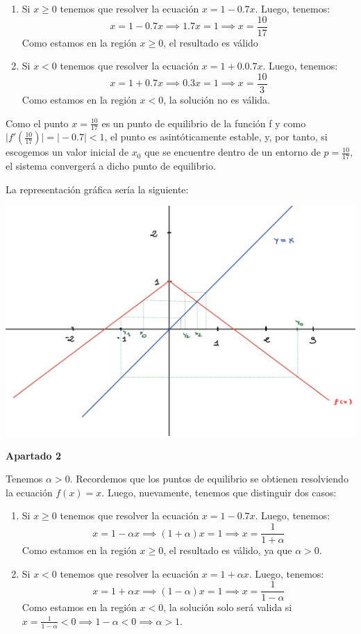 \documentclass[a4paper, 12pt]{article}
\theoremstyle{plain}
\theoremstyle{definition}
\theoremstyle{remark}
\begin{document}
	\begin{enumerate}
		\item Si $x\geq 0$ tenemos que resolver la ecuación $x=1-0.7x$. Luego, tenemos:
		\[x=1-0.7x \implies 1.7x=1 \implies x=\frac{10}{17}\]
		Como estamos en la región $x\geq 0$, el resultado es válido
		\item Si $x<0$ tenemos que resolver la ecuación $x=1+0.0.7x$. Luego, tenemos:
		\[x=1+0.7x \implies 0.3x=1 \implies x=\frac{10}{3}\]
		Como estamos en la región $x<0$, la solución no es válida.
	\end{enumerate}

	Como el punto $x=\frac{10}{17}$ es un punto de equilibrio de la función f y como $\mid f'(\frac{10}{17}) \mid = \mid -0.7 \mid < 1$, el punto es asintóticamente estable, y, por tanto, si escogemos un valor inicial de $x_0$ que se encuentre dentro de un entorno de $p=\frac{10}{17}$, el sistema convergerá a dicho punto de equilibrio.
	
	La representación gráfica sería la siguiente:
	
	\includegraphics[scale=0.25]{graf}
	
	\textbf{Apartado 2}
	
	Tenemos $\alpha >0$. Recordemos que los puntos de equilibrio se obtienen resolviendo la ecuación $f(x)=x$. Luego, nuevamente, tenemos que distinguir dos casos:
	
	\begin{enumerate}
		\item Si $x\geq 0$ tenemos que resolver la ecuación $x=1-0.7x$. Luego, tenemos:
		\[x=1-\alpha x \implies (1+\alpha)x=1 \implies x=\frac{1}{1+\alpha}\]
		Como estamos en la región $x\geq 0$, el resultado es válido, ya que $\alpha >0$.
		\item Si $x<0$ tenemos que resolver la ecuación $x=1+\alpha x$. Luego, tenemos:
		\[x=1+\alpha x \implies (1-\alpha)x=1 \implies x=\frac{1}{1-\alpha}\]
		Como estamos en la región $x<0$, la solución solo será valida si $x=\frac{1}{1-\alpha}<0 \implies 1-\alpha <0 \implies \alpha > 1$.
	\end{enumerate}
\end{document}
